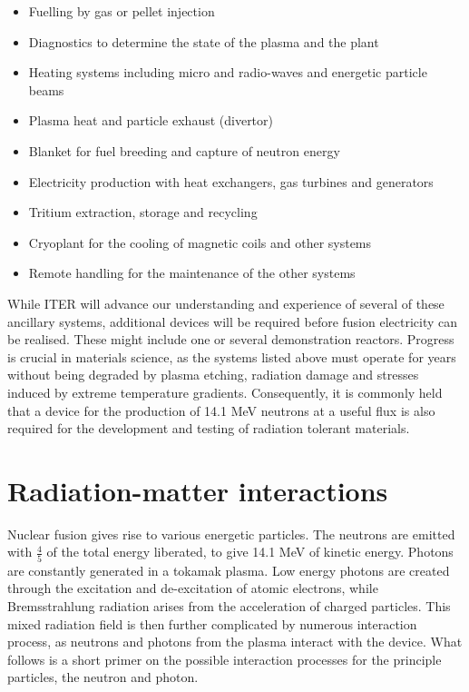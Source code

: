 \begin{itemize}
  \item Fuelling by gas or pellet injection
  \item Diagnostics to determine the state of the plasma and the plant
  \item Heating systems including micro and radio-waves and energetic particle beams
  \item Plasma heat and particle exhaust (divertor)
  \item Blanket for fuel breeding and capture of neutron energy
  \item Electricity production with heat exchangers, gas turbines and generators
  \item Tritium extraction, storage and recycling
  \item Cryoplant for the cooling of magnetic coils and other systems
  \item Remote handling for the maintenance of the other systems
\end{itemize}

While ITER will advance our understanding and experience of several of these ancillary systems, additional devices will be required before fusion electricity can be realised. These might include one or several demonstration reactors. Progress is crucial in materials science, as the systems listed above must operate for years without being degraded by plasma etching, radiation damage and stresses induced by extreme temperature gradients. Consequently, it is commonly held that a device for the production of 14.1 MeV  neutrons at a useful flux is also required for the development and testing of radiation tolerant materials.

\section{Radiation-matter interactions}
Nuclear fusion gives rise to various energetic particles. The neutrons are emitted with $\frac{4}{5}$ of the total energy liberated, to give 14.1 MeV of kinetic energy. Photons are constantly generated in a tokamak plasma. Low energy photons are created through the excitation and de-excitation of atomic electrons, while Bremsstrahlung radiation arises from the acceleration of charged particles. This mixed radiation field is then further complicated by numerous interaction process, as neutrons and photons from the plasma interact with the device. What follows is a short primer on the possible interaction processes for the principle particles, the neutron and photon.

